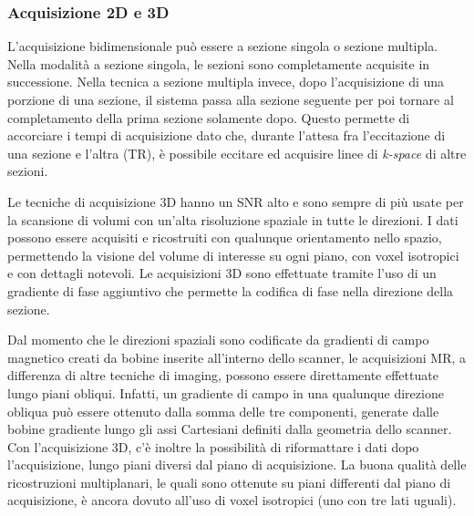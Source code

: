 \documentclass[leqno,10pt,twocolumn,a4paper]{article}
\begin{document}
	\subsubsection{Acquisizione 2D e 3D}
	L'acquisizione bidimensionale può essere a sezione singola o sezione multipla. Nella modalità a sezione singola, le sezioni sono completamente acquisite in successione. Nella tecnica a sezione
	multipla invece, dopo l'acquisizione di una porzione di una sezione, il sistema passa alla sezione seguente per poi tornare al completamento della prima sezione solamente dopo. Questo permette 
	di accorciare i tempi di acquisizione dato che, durante l'attesa fra l'eccitazione di una sezione e l'altra (TR), è possibile eccitare ed acquisire linee di \textit{k-space} di altre sezioni.
	\par Le tecniche di acquisizione 3D hanno un SNR alto e sono sempre di più usate per la scansione di volumi con un'alta risoluzione spaziale in tutte le direzioni. I dati possono essere acquisiti e 
	ricostruiti con qualunque orientamento nello spazio, permettendo la visione del volume di interesse su ogni piano, con voxel isotropici e con dettagli notevoli. Le acquisizioni 3D sono effettuate
	tramite l'uso di un gradiente di fase aggiuntivo che permette la codifica di fase nella direzione della sezione. \par Dal momento che le direzioni spaziali sono codificate da gradienti di campo magnetico
	creati da bobine inserite all'interno dello scanner, le acquisizioni MR, a differenza di altre tecniche di imaging, possono essere direttamente effettuate lungo piani obliqui. Infatti, un gradiente di campo
	in una qualunque direzione obliqua può essere ottenuto dalla somma delle tre componenti, generate dalle bobine gradiente lungo gli assi Cartesiani definiti dalla geometria dello scanner. Con
	l'acquisizione 3D, c'è inoltre la possibilità di riformattare i dati dopo l'acquisizione, lungo piani diversi dal piano di acquisizione. La buona qualità delle ricostruzioni multiplanari, le quali sono ottenute
	su piani differenti dal piano di acquisizione, è ancora dovuto all'uso di voxel isotropici (uno con tre lati uguali).
\end{document}
